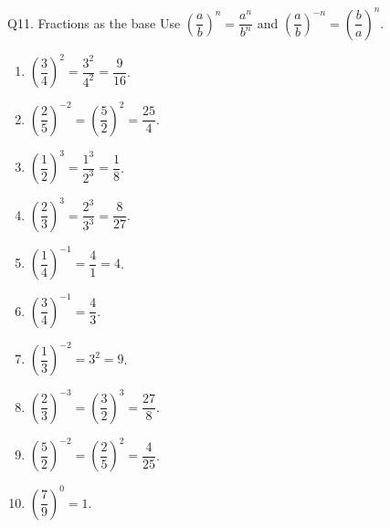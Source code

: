 \documentclass[12pt,a4paper]{article}
\begin{document}
\begin{solution}{Q11. Fractions as the base}
Use \(\left(\dfrac ab\right)^n=\dfrac{a^n}{b^n}\) and
\(\left(\dfrac ab\right)^{-n}=\left(\dfrac ba\right)^n\).
\begin{enumerate}[label=\textbf{(\alph*)}]
\item \(\left(\dfrac34\right)^2=\dfrac{3^2}{4^2}=\dfrac9{16}\).
\item \(\left(\dfrac25\right)^{-2}=\left(\dfrac52\right)^2=\dfrac{25}{4}\).
\item \(\left(\dfrac12\right)^3=\dfrac{1^3}{2^3}=\dfrac18\).
\item \(\left(\dfrac23\right)^3=\dfrac{2^3}{3^3}=\dfrac8{27}\).
\item \(\left(\dfrac14\right)^{-1}=\dfrac41=4\).
\item \(\left(\dfrac34\right)^{-1}=\dfrac43\).
\item \(\left(\dfrac13\right)^{-2}=3^2=9\).
\item \(\left(\dfrac23\right)^{-3}=\left(\dfrac32\right)^3=\dfrac{27}{8}\).
\item \(\left(\dfrac52\right)^{-2}=\left(\dfrac25\right)^2=\dfrac4{25}\).
\item \(\left(\dfrac79\right)^0=1\).
\end{enumerate}
\end{solution}
\end{document}
